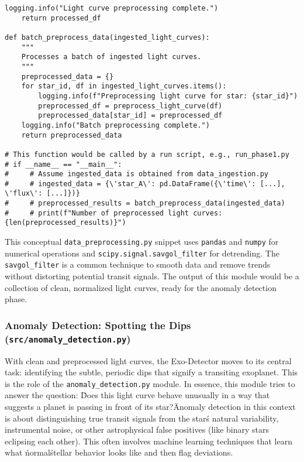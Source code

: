 \documentclass{article}
\begin{document}
\begin{lstlisting}[caption={Conceptual Data Preprocessing Logic}]
    logging.info("Light curve preprocessing complete.")
    return processed_df

def batch_preprocess_data(ingested_light_curves):
    """
    Processes a batch of ingested light curves.
    """
    preprocessed_data = {}
    for star_id, df in ingested_light_curves.items():
        logging.info(f"Preprocessing light curve for star: {star_id}")
        preprocessed_df = preprocess_light_curve(df)
        preprocessed_data[star_id] = preprocessed_df
    logging.info("Batch preprocessing complete.")
    return preprocessed_data

# This function would be called by a run script, e.g., run_phase1.py
# if __name__ == "__main__":
#     # Assume ingested_data is obtained from data_ingestion.py
#     # ingested_data = {\'star_A\': pd.DataFrame({\'time\': [...], \'flux\': [...]})}
#     # preprocessed_results = batch_preprocess_data(ingested_data)
#     # print(f"Number of preprocessed light curves: {len(preprocessed_results)}")
\end{lstlisting}

This conceptual \texttt{data\_preprocessing.py} snippet uses \texttt{pandas} and \texttt{numpy} for numerical operations and \texttt{scipy.signal.savgol\_filter} for detrending. The \texttt{savgol\_filter} is a common technique to smooth data and remove trends without distorting potential transit signals. The output of this module would be a collection of clean, normalized light curves, ready for the anomaly detection phase.

\subsubsection{Anomaly Detection: Spotting the Dips (\texttt{src/anomaly\_detection.py})}

With clean and preprocessed light curves, the Exo-Detector moves to its central task: identifying the subtle, periodic dips that signify a transiting exoplanet. This is the role of the \texttt{anomaly\_detection.py} module. In essence, this module tries to answer the question: \"Does this light curve behave unusually in a way that suggests a planet is passing in front of its star?\"

Anomaly detection in this context is about distinguishing true transit signals from the star\'s natural variability, instrumental noise, or other astrophysical false positives (like binary stars eclipsing each other). This often involves machine learning techniques that learn what \'normal\' stellar behavior looks like and then flag deviations.
\end{document}
